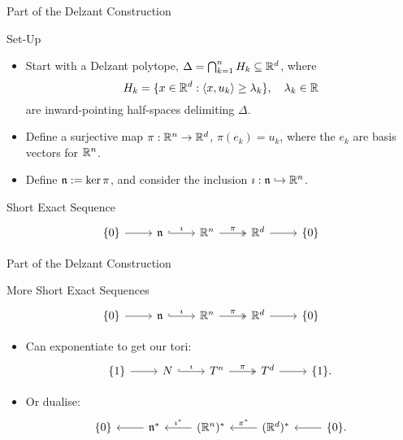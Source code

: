 \begin{frame}[fragile]{Part of the Delzant Construction}
    \begin{block}{Set-Up}
        \begin{itemize}
            \item Start with a Delzant polytope, $\Delta = \bigcap_{k = 1}^{n} H_{k} \subseteq \mathbb{R}^{d} $, where
                $$ H_{k} = \{ x \in \mathbb{R}^{d} : \langle x, u_{k} \rangle \geq \lambda_{k} \}, \quad \lambda_{k} \in \mathbb{R} $$
            are inward-pointing half-spaces delimiting $\Delta$.
            \item Define a surjective map $\pi : \mathbb{R}^{n} \rightarrow \mathbb{R}^{d}$, $\pi(e_{k}) = u_{k}$, where the $e_{k}$ are basis vectors for $\mathbb{R}^{n}$.
            \item Define $\mathfrak{n} := \ker \pi$, and consider the inclusion $\imath : \mathfrak{n} \hookrightarrow \mathbb{R}^{n}$.
        \end{itemize}
    \end{block}
    \begin{block}{Short Exact Sequence}
        \[
            \begin{tikzcd}
            \{0\} \arrow[r] & \mathfrak{n} \arrow[r, "\imath", hook] & \mathbb{R}^{n} \arrow[r, "\pi", two heads] & \mathbb{R}^{d} \arrow[r] & \{0\}
            \end{tikzcd}
        \]
    \end{block}
\end{frame}

\begin{frame}[fragile]{Part of the Delzant Construction}
    \begin{block}{More Short Exact Sequences}
        \[
            \begin{tikzcd}
                \{0\} \arrow[r] & \mathfrak{n} \arrow[r, "\imath", hook] & \mathbb{R}^{n} \arrow[r, "\pi", two heads] & \mathbb{R}^{d} \arrow[r] & \{0\}
            \end{tikzcd}
        \]
        \begin{itemize} 
            \item Can exponentiate to get our tori:
            \[
                \begin{tikzcd}
                    \{1\} \arrow[r] & N \arrow[r, "\imath", hook] & T^{n} \arrow[r, "\pi", two heads] & T^{d} \arrow[r] & \{1\}.
                \end{tikzcd}
            \]
            \item Or dualise:
            \[
                \begin{tikzcd}
                    \{0\} & \arrow[l] \mfn^{\ast} & \arrow[l, "\imath^{\ast}"'] (\RR^{n})^{\ast} & \arrow[l, "\pi^{\ast}"'] (\RR^{d})^{\ast} & \arrow[l] \{0\}.
                \end{tikzcd}
            \]
        \end{itemize}
    \end{block}
\end{frame}

